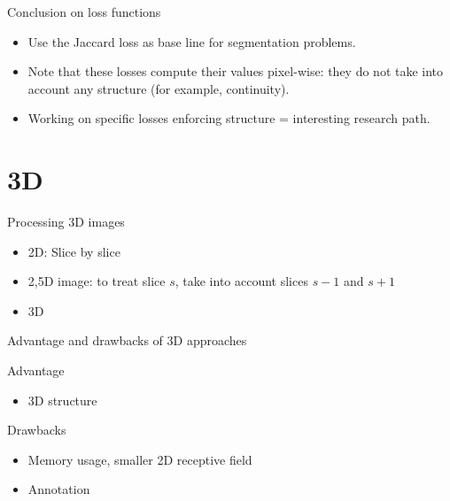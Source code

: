 \documentclass[xcolor=pdftex,dvipsnames,table,mathserif]{beamer}
\begin{document}
\begin{frame}{Conclusion on loss functions}

  \begin{itemize}
  \item Use the Jaccard loss as base line for segmentation problems.
  \item Note that these losses compute their values pixel-wise: they do not take into account any structure (for example, continuity).
  \item Working on specific losses enforcing structure = interesting research path.
  \end{itemize}
\end{frame}

\section{3D}


\begin{frame}{Processing 3D images}

\begin{itemize}
\item 2D: Slice by slice
\item 2,5D image: to treat slice $s$, take into account slices $s-1$ and $s+1$
\item 3D
\end{itemize}

\end{frame}

\begin{frame}{Advantage and drawbacks of 3D approaches}

\begin{block}{Advantage}
  \begin{itemize}
  \item 3D structure
  \end{itemize}
\end{block}

\begin{block}{Drawbacks}
  \begin{itemize}
  \item Memory usage, smaller 2D receptive field
  \item Annotation
  \end{itemize}
\end{block}

\end{frame}
\end{document}
